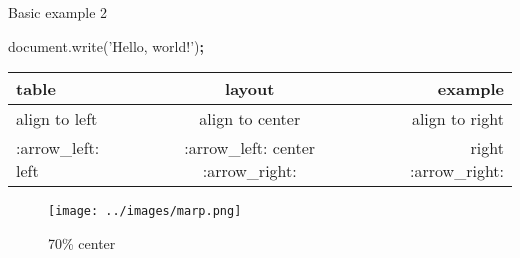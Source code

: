 \documentclass[ignorenonframetext,]{beamer}
\newenvironment{Shaded}{\begin{snugshade}}{\end{snugshade}}
\newcommand{\StringTok}[1]{\textcolor[rgb]{0.31,0.60,0.02}{{#1}}}
\newcommand{\VariableTok}[1]{\textcolor[rgb]{0.00,0.00,0.00}{{#1}}}
\newcommand{\OperatorTok}[1]{\textcolor[rgb]{0.81,0.36,0.00}{\textbf{{#1}}}}
\newcommand{\AttributeTok}[1]{\textcolor[rgb]{0.77,0.63,0.00}{{#1}}}
\newcommand{\NormalTok}[1]{{#1}}
\begin{document}
\begin{frame}[fragile]{Basic example 2}

\begin{Shaded}
\begin{Highlighting}[]
\VariableTok{document}\NormalTok{.}\AttributeTok{write}\NormalTok{(}\StringTok{'Hello, world!'}\NormalTok{)}\OperatorTok{;}
\end{Highlighting}
\end{Shaded}

\begin{longtable}[c]{@{}lcr@{}}
\toprule
\begin{minipage}[b]{0.05\columnwidth}\raggedright\strut
table
\strut\end{minipage} &
\begin{minipage}[b]{0.05\columnwidth}\centering\strut
layout
\strut\end{minipage} &
\begin{minipage}[b]{0.05\columnwidth}\raggedleft\strut
example
\strut\end{minipage}\tabularnewline
\midrule
\endhead
\begin{minipage}[t]{0.05\columnwidth}\raggedright\strut
align to left
\strut\end{minipage} &
\begin{minipage}[t]{0.05\columnwidth}\centering\strut
align to center
\strut\end{minipage} &
\begin{minipage}[t]{0.05\columnwidth}\raggedleft\strut
align to right
\strut\end{minipage}\tabularnewline
\begin{minipage}[t]{0.05\columnwidth}\raggedright\strut
:arrow\_left: left
\strut\end{minipage} &
\begin{minipage}[t]{0.05\columnwidth}\centering\strut
:arrow\_left: center :arrow\_right:
\strut\end{minipage} &
\begin{minipage}[t]{0.05\columnwidth}\raggedleft\strut
right :arrow\_right:
\strut\end{minipage}\tabularnewline
\bottomrule
\end{longtable}

\begin{figure}[htbp]
\centering
\texttt{[image: ../images/marp.png]}
\caption{70\% center}
\end{figure}

\end{frame}
\end{document}
